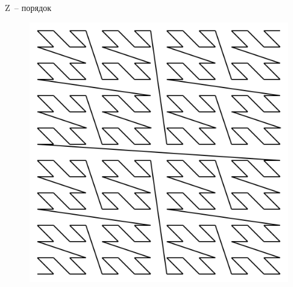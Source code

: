 \documentclass[presentation,18pt]{beamer}
\begin{document}
\begin{frame}[t]
\begin{columns}
\begin{block}{Z~-- порядок}
			\begin{figure}
				\includegraphics[width=\textwidth]{img/ZOrderCurve.png}
			\end{figure}
		\end{block}

	\end{columns}
\end{frame}
\end{document}
